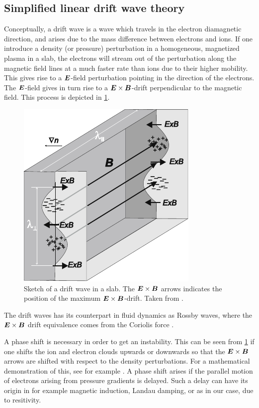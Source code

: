 \subsection{Simplified linear drift wave theory}
\label{sec:simpleLin}
%
Conceptually, a drift wave is a wave which travels in the electron diamagnetic direction, and arises due to the mass difference between electrons and ions.
If one introduce a density (or pressure) perturbation in a homogeneous, magnetized plasma in a slab, the  electrons will stream out of the perturbation along the magnetic field lines at a much faster rate than ions due to their higher mobility.
This gives rise to a $\boldsymbol{E}$-field perturbation pointing in the direction of the electrons.
The $\boldsymbol{E}$-field gives in turn rise to a $\boldsymbol{E}\times\boldsymbol{B}$-drift perpendicular to the magnetic field.
This process is depicted in \cref{fig:DW}.
%
\begin{figure}[htb]
    \centering
    \includegraphics{fig/driftwave}
    \caption{
        Sketch of a drift wave in a slab.
        The $\boldsymbol{E}\times\boldsymbol{B}$ arrows indicates the position of the maximum $\boldsymbol{E}\times\boldsymbol{B}$-drift.
        Taken from \cite{Stroth2011book}.
    }
    \label{fig:DW}
\end{figure}
%
The drift waves has its counterpart in fluid dynamics as Rossby waves, where the $\boldsymbol{E}\times\boldsymbol{B}$ drift equivalence comes from the Coriolis force \cite{Shepherd1987}.

A phase shift is necessary in order to get an instability.
This can be seen from \cref{fig:DW} if one shifts the ion and electron clouds upwards or downwards so that the $\boldsymbol{E}\times\boldsymbol{B}$ arrows are shifted with respect to the density perturbations.
For a mathematical demonstration of this, see for example \cite{Garcia2001a}.
A phase shift arises if the parallel motion of electrons arising from pressure gradients is delayed.
Such a delay can have its origin in for example magnetic induction, Landau damping, or as in our case, due to resitivity.


